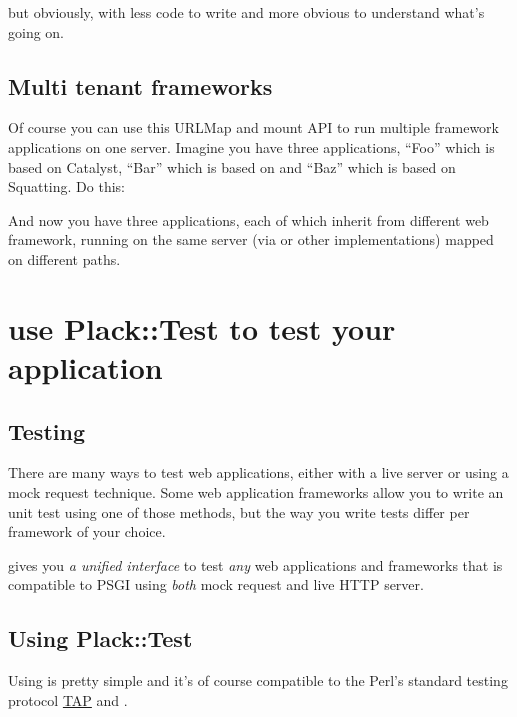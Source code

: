 %
but obviously, with less code to write and more obvious to understand
what's going on.

\section{Multi tenant frameworks}\label{multi-tenant-frameworks}

Of course you can use this URLMap and mount API to run multiple
framework applications on one server. Imagine you have three
applications, ``Foo'' which is based on Catalyst, ``Bar'' which is based
on  and ``Baz'' which is based on Squatting. Do this:


And now you have three applications, each of which inherit from
different web framework, running on the same server (via  or
other  implementations) mapped on different paths.

\chapter{use Plack::Test to test your
application}\label{day-13-use-placktest-to-test-your-application}

\section{Testing}\label{testing}

There are many ways to test web applications, either with a live server
or using a mock request technique. Some web application frameworks allow
you to write an unit test using one of those methods, but the way you
write tests differ per framework of your choice.

 gives you \emph{a unified interface} to test \emph{any} web
applications and frameworks that is compatible to PSGI using \emph{both}
mock request and live HTTP server.

\section{Using Plack::Test}\label{using-placktest}

Using  is pretty simple and it's of course compatible to the
Perl's standard testing protocol
\href{http://testanything.org/wiki/}{TAP} and
\href{http://search.cpan.org/perldoc?Test::More}{}.

